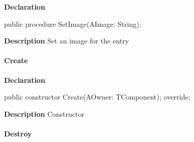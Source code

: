 \documentclass{report}
\newif\ifpdf
\begin{document}
\label{lentries.TListEntry-SetImage}
\begin{list}{}{
\setlength{\itemindent}{0cm}
\setlength{\listparindent}{0cm}
\setlength{\leftmargin}{\evensidemargin}
\addtolength{\leftmargin}{\tmplength}
\settowidth{\labelsep}{X}
\addtolength{\leftmargin}{\labelsep}
\setlength{\labelwidth}{\tmplength}
}
\item[\textbf{Declaration}\hfill]
\ifpdf
\begin{flushleft}
\fi
\begin{ttfamily}
public procedure SetImage(AImage: String);\end{ttfamily}

\ifpdf
\end{flushleft}
\fi

\par
\item[\textbf{Description}]
Set an image for the entry

\end{list}
\paragraph*{Create}\hspace*{\fill}

\label{lentries.TListEntry-Create}
\begin{list}{}{
\setlength{\itemindent}{0cm}
\setlength{\listparindent}{0cm}
\setlength{\leftmargin}{\evensidemargin}
\addtolength{\leftmargin}{\tmplength}
\settowidth{\labelsep}{X}
\addtolength{\leftmargin}{\labelsep}
\setlength{\labelwidth}{\tmplength}
}
\item[\textbf{Declaration}\hfill]
\ifpdf
\begin{flushleft}
\fi
\begin{ttfamily}
public constructor Create(AOwner: TComponent); override;\end{ttfamily}

\ifpdf
\end{flushleft}
\fi

\par
\item[\textbf{Description}]
Constructor

\end{list}
\paragraph*{Destroy}\hspace*{\fill}
\end{document}

